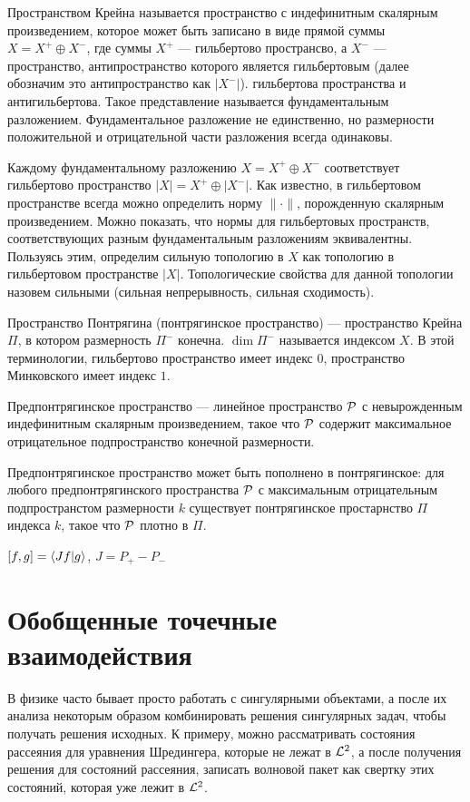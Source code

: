Пространством Крейна называется пространство с индефинитным скалярным произведением, которое может быть записано в виде прямой суммы $X = X^+ \oplus X^-$, где суммы $X^+$ — гильбертово пространсво, а $X^-$ — пространство, антипространство которого является гильбертовым (далее обозначим это антипространство как $|X^-|$). гильбертова пространства и антигильбертова. Такое представление называется фундаментальным разложением. Фундаментальное разложение не единственно, но размерности положительной и отрицательной части разложения всегда одинаковы.

Каждому фундаментальному разложению $X = X^+ \oplus X^-$ соответствует гильбертово пространство $|X| = X^+ \oplus |X^-|$. Как известно, в гильбертовом пространстве всегда можно определить норму $\| \cdot \|$, порожденную скалярным произведением. Можно показать, что нормы для гильбертовых пространств, соответствующих разным фундаментальным разложениям эквивалентны. Пользуясь этим, определим сильную топологию в $X$ как топологию в гильбертовом пространстве $|X|$. Топологические свойства для данной топологии назовем сильными (сильная непрерывность, сильная сходимость).

Пространство Понтрягина (понтрягинское пространство) — пространство Крейна $\Pi$, в котором размерность $\Pi^-$ конечна. $\dim \Pi^-$ называется индексом $X$. В этой терминологии, гильбертово пространство имеет индекс $0$, пространство Минковского имеет индекс $1$.

Предпонтрягинское пространство — линейное пространство $\mathcal{P}$ с невырожденным индефинитным скалярным произведением, такое что $\mathcal{P}$ содержит максимальное отрицательное подпространство конечной размерности. 

Предпонтрягинское пространство может быть пополнено в понтрягинское: для любого предпонтрягинского пространства $\mathcal{P}$ с максимальным отрицательным подпространстом размерности $k$ существует понтрягинское простарнство $\Pi$ индекса $k$, такое что $\mathcal{P}$ плотно в $\Pi$.

$[f, g] = \ip{J f}{g}$, $J = P_+ - P_-$


\section{Обобщенные точечные взаимодействия}
В физике часто бывает просто работать с сингулярными объектами, а после их анализа некоторым образом комбинировать решения сингулярных задач, чтобы получать решения исходных. К примеру, можно рассматривать состояния рассеяния для уравнения Шредингера, которые не лежат в $\mathcal{L}^2$, а после получения решения для состояний рассеяния, записать волновой пакет как свертку этих состояний, которая уже лежит в $\mathcal{L}^2$. 

